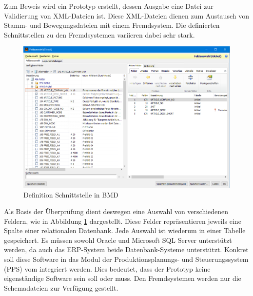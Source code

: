 Zum Beweis wird ein Prototyp erstellt, dessen Aus\-gabe eine Datei zur Validierung von XML-\-Dateien ist. Diese XML-Dateien dienen zum Austausch von Stamm-\- und Bewegungsdateien mit einem Fremd\-system. 
Die definierten Schnittstellen zu den Fremdsystemen variieren dabei sehr stark.

\begin{figure}
    \centering
    \includegraphics[width=.95\textwidth]{images/Feldauswahl.png}
    \caption{Definition Schnittstelle in BMD}
    \label{fig:Feldauswahl}
\end{figure}

Als Basis der Überprüfung dient deswegen eine Auswahl von 
verschiedenen Feldern, wie in Abbildung \ref{fig:Feldauswahl} dargestellt. 
Diese Felder repräsentieren jeweils eine Spalte einer relationalen Datenbank. 
Jede Auswahl ist wiederum in einer Tabelle gespeichert. 
Es müssen sowohl Oracle und Microsoft SQL Server unterstützt werden, da auch das ERP-System beide Datenbank-Systeme unterstützt. 
Konkret soll diese Software in das Modul der Produktionsplanungs- und Steuerungssystem (PPS) vom \BMD integriert werden. 
Dies bedeutet, dass der Prototyp keine eigen\-ständige Software sein soll oder muss. 
Den Fremdsystemen werden nur die Schemadateien zur Verfügung gestellt.

